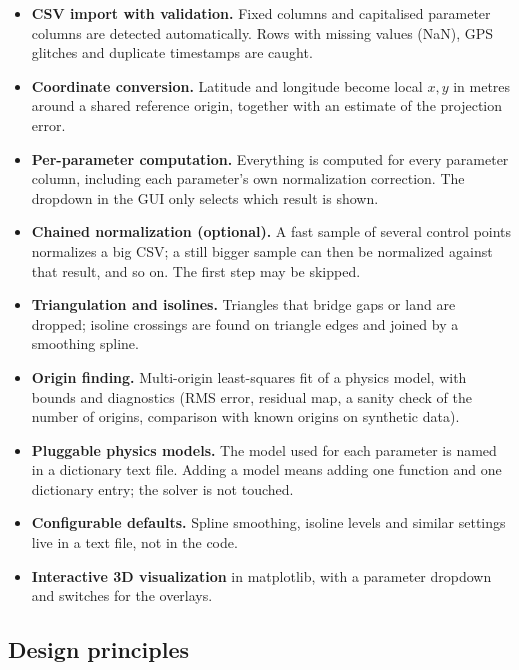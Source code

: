 \documentclass{article}
\begin{document}
\begin{itemize}
\item \textbf{CSV import with validation.} Fixed columns and capitalised
      parameter columns are detected automatically. Rows with missing values
      (NaN), GPS glitches and duplicate timestamps are caught.
\item \textbf{Coordinate conversion.} Latitude and longitude become local
      $x,y$ in metres around a shared reference origin, together with an
      estimate of the projection error.
\item \textbf{Per-parameter computation.} Everything is computed for every
      parameter column, including each parameter's own normalization
      correction. The dropdown in the GUI only selects which result is shown.
\item \textbf{Chained normalization (optional).} A fast sample of several
      control points normalizes a big CSV; a still bigger sample can then be
      normalized against that result, and so on. The first step may be
      skipped.
\item \textbf{Triangulation and isolines.} Triangles that bridge gaps or land
      are dropped; isoline crossings are found on triangle edges and joined
      by a smoothing spline.
\item \textbf{Origin finding.} Multi-origin least-squares fit of a physics
      model, with bounds and diagnostics (RMS error, residual map, a sanity
      check of the number of origins, comparison with known origins on
      synthetic data).
\item \textbf{Pluggable physics models.} The model used for each parameter is
      named in a dictionary text file. Adding a model means adding one
      function and one dictionary entry; the solver is not touched.
\item \textbf{Configurable defaults.} Spline smoothing, isoline levels and
      similar settings live in a text file, not in the code.
\item \textbf{Interactive 3D visualization} in matplotlib, with a parameter
      dropdown and switches for the overlays.
\end{itemize}

\subsection{Design principles}
\label{sec:principles}
\end{document}
